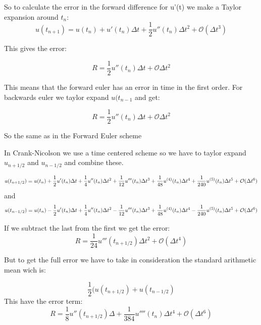 \documentclass[a4paper,10pt]{article}
\begin{document}
So to calculate the error in the forward difference for u'(t) we make a Taylor expansion around $t_n$:
\begin{equation}
 u(t_{n+1}) = u(t_n) + u'(t_n)\Delta t + \frac{1}{2}u''(t_n)\Delta t^2 + \mathcal{O}(\Delta t^3)
\end{equation}

This gives the error:

\begin{equation}
 R = \frac{1}{2}u''(t_n)\Delta t + \mathcal{O}\Delta t^2
\end{equation}

This means that the forward euler has an error in time in the first order. 
For backwards euler we taylor expand $u(t_{n-1}$ and get:

\begin{equation}
  R = \frac{1}{2}u''(t_n)\Delta t + \mathcal{O}\Delta t^2
\end{equation}

So the same as in the Forward Euler scheme

In Crank-Nicolson we use a time centered scheme so we have to taylor expand $u_{n+ 1/2}$ and $u_{n-1/2}$ and combine these. 

\begin{equation}
u(t_{n+1/2}) = u(t_n) + \frac{1}{2} u'(t_n)\Delta t + \frac{1}{4} u''(t_n) \Delta t^2 + \\
\frac{1}{12}u'''(t_n) \Delta t^3 + \frac{1}{48} u^{(4)}(t_n)\Delta t^4 + \\
\frac{1}{240} u^{(5)} (t_n) \Delta t^5 + \mathcal{O}(\Delta t^6)
\end{equation}
and
\begin{equation}
 u(t_{n-1/2}) = u(t_n) - \frac{1}{2} u'(t_n)\Delta t + \frac{1}{4} u''(t_n) \Delta t^2 - \\
\frac{1}{12}u'''(t_n) \Delta t^3 + \frac{1}{48} u^{(4)}(t_n)\Delta t^4 - \\
\frac{1}{240} u^{(5)} (t_n) \Delta t^5 + \mathcal{O}(\Delta t^6)
\end{equation}

If we subtract the last from the first we get the error:
\begin{equation}
 R = \frac{1}{24}u'''(t_{n+1/2})\Delta t^2 + \mathcal{O}(\Delta t^4)
\end{equation}

But to get the full error we have to take in consideration the standard arithmetic mean wich is:

\begin{equation}
 \frac{1}{2}(u(t_{n+1/2}) + u(t_{n - 1/2}) 
\end{equation}
This have the error term:
\begin{equation}
 R = \frac{1}{8}u''(t_{n+1/2})\Delta + \frac{1}{384}u''''(t_n)\Delta t^4 + \mathcal{O}(\Delta t^6)
\end{equation}
\end{document}
